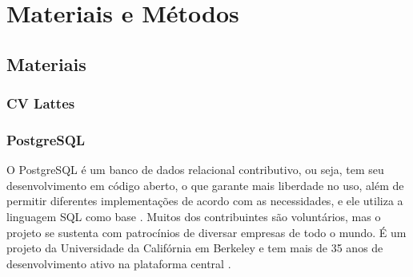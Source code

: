 \chapter{Materiais e Métodos}\label{cap:materialemetodos}

\section{Materiais}\label{sec:materiais}



\subsection{CV Lattes}\label{subsec:lattes}

\subsection{PostgreSQL}\label{subsec:postgresql}
O PostgreSQL é um banco de dados relacional contributivo, ou seja, tem seu desenvolvimento em código aberto, o que garante mais liberdade
no uso, além de permitir diferentes implementações de acordo com as necessidades, e ele utiliza a linguagem SQL como base \cite{Amazon}. 
Muitos dos contribuintes são voluntários, mas o projeto se sustenta com patrocínios de diversar empresas de todo o mundo.
É um projeto da Universidade da Califórnia em Berkeley e tem mais de 35 anos de desenvolvimento ativo na plataforma central \cite{PostgreSQL}.


